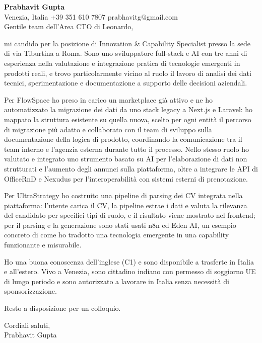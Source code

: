 \documentclass[a4paper,10.5pt]{article}
\begin{document}
\textbf{Prabhavit Gupta}\\
Venezia, Italia \textbar{} +39 351 610 7807 \textbar{} prabhavitg@gmail.com\\[10pt]
Gentile team dell'Area CTO di Leonardo,

mi candido per la posizione di Innovation \& Capability Specialist presso la sede di via Tiburtina a Roma. Sono uno sviluppatore full-stack e AI con tre anni di esperienza nella valutazione e integrazione pratica di tecnologie emergenti in prodotti reali, e trovo particolarmente vicino al ruolo il lavoro di analisi dei dati tecnici, sperimentazione e documentazione a supporto delle decisioni aziendali.

Per FlowSpace ho preso in carico un marketplace già attivo e ne ho automatizzato la migrazione dei dati da uno stack legacy a Next.js e Laravel: ho mappato la struttura esistente su quella nuova, scelto per ogni entità il percorso di migrazione più adatto e collaborato con il team di sviluppo sulla documentazione della logica di prodotto, coordinando la comunicazione tra il team interno e l'agenzia esterna durante tutto il processo. Nello stesso ruolo ho valutato e integrato uno strumento basato su AI per l'elaborazione di dati non strutturati e l'aumento degli annunci sulla piattaforma, oltre a integrare le API di OfficeRnD e Nexudus per l'interoperabilità con sistemi esterni di prenotazione.

Per UltraStrategy ho costruito una pipeline di parsing dei CV integrata nella piattaforma: l'utente carica il CV, la pipeline estrae i dati e valuta la rilevanza del candidato per specifici tipi di ruolo, e il risultato viene mostrato nel frontend; per il parsing e la generazione sono stati usati n8n ed Eden AI, un esempio concreto di come ho tradotto una tecnologia emergente in una capability funzionante e misurabile.

Ho una buona conoscenza dell'inglese (C1) e sono disponibile a trasferte in Italia e all'estero. Vivo a Venezia, sono cittadino indiano con permesso di soggiorno UE di lungo periodo e sono autorizzato a lavorare in Italia senza necessità di sponsorizzazione.

Resto a disposizione per un colloquio.

Cordiali saluti,\\
Prabhavit Gupta
\end{document}

